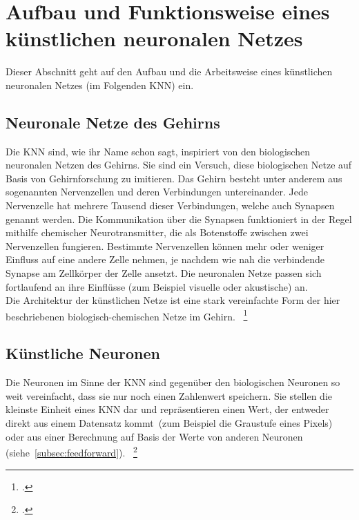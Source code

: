\section{Aufbau und Funktionsweise eines künstlichen neuronalen Netzes}\label{sec:aufbau}
Dieser Abschnitt geht auf den Aufbau und die Arbeitsweise eines künstlichen neuronalen Netzes (im Folgenden KNN) ein.

\subsection{Neuronale Netze des Gehirns}\label{subsec:gehirn}
Die KNN sind, wie ihr Name schon sagt, inspiriert von den biologischen neuronalen Netzen des Gehirns.
Sie sind ein Versuch, diese biologischen Netze auf Basis von Gehirnforschung zu imitieren.
Das Gehirn besteht unter anderem aus sogenannten Nervenzellen und deren Verbindungen untereinander.
Jede Nervenzelle hat mehrere Tausend dieser Verbindungen, welche auch Synapsen genannt werden.
Die Kommunikation über die Synapsen funktioniert in der Regel mithilfe chemischer Neurotransmitter, die als Botenstoffe zwischen zwei Nervenzellen fungieren.
Bestimmte Nervenzellen können mehr oder weniger Einfluss auf eine andere Zelle nehmen, je nachdem wie nah die verbindende Synapse am Zellkörper der Zelle ansetzt.
Die neuronalen Netze passen sich fortlaufend an ihre Einflüsse (zum Beispiel visuelle oder akustische) an.\\
Die Architektur der künstlichen Netze ist eine stark vereinfachte Form der hier beschriebenen biologisch-chemischen Netze im Gehirn.
~\footcite{ct-netzgespinste}

\subsection{Künstliche Neuronen}\label{subsec:neuronen}
Die Neuronen im Sinne der KNN sind gegenüber den biologischen Neuronen so weit vereinfacht, dass sie nur noch einen Zahlenwert speichern.
Sie stellen die kleinste Einheit eines KNN dar und repräsentieren einen Wert, der entweder direkt aus einem Datensatz kommt~(zum Beispiel die Graustufe eines Pixels) oder aus einer Berechnung auf Basis der Werte von anderen Neuronen (siehe~\autoref{subsec:feedforward}).
~\footcite{3b1b-1}

